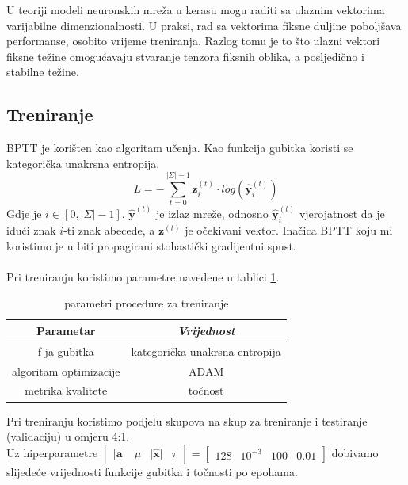 \documentclass[conference]{IEEEtran}
\begin{document}
U teoriji modeli neuronskih mreža u kerasu mogu raditi sa ulaznim vektorima varijabilne dimenzionalnosti. U praksi, rad sa vektorima fiksne duljine poboljšava performanse, osobito vrijeme treniranja. Razlog tomu je to što ulazni vektori fiksne težine omogućavaju stvaranje tenzora fiksnih oblika, a posljedično i stabilne težine.\\



\subsection{Treniranje} \label{subsect:trening}
BPTT je korišten kao algoritam učenja.
Kao funkcija gubitka koristi se kategorička unakrsna entropija.
\begin{equation}
L = - \sum_{t = 0}^{\lvert \Sigma \rvert-1} \mathbf{z}_i^{(t)} \cdot log(\hat{\mathbf{y}}_i^{(t)})
\end{equation}
Gdje je $i \in [0, \lvert \Sigma \rvert - 1]$. $\hat{\mathbf{y}}^{(t)}$ je izlaz mreže, odnosno $\hat{\mathbf{y}}_i^{(t)}$ vjerojatnost da je idući znak $i$-ti znak abecede, a $\mathbf{z}^{(t)}$ je očekivani vektor.
Inačica BPTT koju mi koristimo je u biti propagirani stohastički gradijentni spust.\\
\\
Pri treniranju koristimo parametre navedene u tablici \ref{tab:trening}.
\begin{table}[htbp]
\caption{parametri procedure za treniranje}
\begin{center}
\begin{tabular}{|c|c|}
\hline
\textbf{Parametar} & \textbf{\textit{Vrijednost}}\\ \hline
f-ja gubitka & kategorička unakrsna entropija \\ \hline
algoritam optimizacije & ADAM \\ \hline
metrika kvalitete & točnost \\ \hline
\end{tabular}
\label{tab:trening}
\end{center}
\end{table}

Pri treniranju koristimo podjelu skupova na skup za treniranje i testiranje (validaciju) u omjeru 4:1.\\
Uz hiperparametre $\begin{bmatrix} \lvert \mathbf{a} \rvert & \mu & \lvert \mathbf{\hat{x}} \rvert & \tau \end{bmatrix} = \begin{bmatrix} 128 & 10^{-3} & 100 & 0.01  \end{bmatrix}$ dobivamo slijedeće vrijednosti funkcije gubitka i točnosti po epohama.
\end{document}
